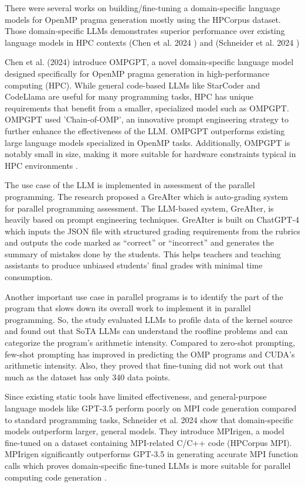 \documentclass[conference]{IEEEtran}
\begin{document}
There were several works on building/fine-tuning a domain-specific language models for OpenMP pragma generation mostly using the HPCorpus dataset. Those domain-specific LLMs demonstrates superior performance over existing language models in HPC contexts (Chen et al. 2024 \cite{Chen2024OMPGPTAG}) and (Schneider et al. 2024 \cite{Schneider2024MPIrigenMC})

Chen et al. (2024) introduce OMPGPT, a novel domain-specific language model designed specifically for OpenMP pragma generation in high-performance computing (HPC). While general code-based LLMs like StarCoder and CodeLlama are useful for many programming tasks, HPC has unique requirements that benefit from a smaller, specialized model such as OMPGPT. OMPGPT used 'Chain-of-OMP', an innovative prompt engineering strategy to further enhance the effectiveness of the LLM. OMPGPT outperforms existing large language models specialized in OpenMP tasks. Additionally, OMPGPT is notably small in size, making it more suitable for hardware constraints typical in HPC environments \cite{Chen2024OMPGPTAG}.

The use case of the LLM is implemented in assessment of the parallel programming. The research \cite{grandel2024applying} proposed a GreAIter which is auto-grading system for parallel programming assessment. The LLM-based system, GreAIter, is heavily based on prompt engineering techniques. GreAIter is built on ChatGPT-4 which inputs the JSON file with structured grading requirements from the rubrics and outputs the code marked as “correct” or “incorrect” and generates the summary of mistakes done by the students. This helps teachers and teaching assistants to produce unbiased students’ final grades with minimal time consumption. 

Another important use case in parallel programs is to identify the part of the program that slows down its overall work to implement it in parallel programming. So, the study \cite{ bolet2025can} evaluated LLMs to profile data of the kernel source and found out that SoTA LLMs can understand the roofline problems and can categorize the program’s arithmetic intensity. Compared to zero-shot prompting, few-shot prompting has improved in predicting the OMP programs and CUDA’s arithmetic intensity. Also, they proved that fine-tuning did not work out that much as the dataset has only 340 data points. 


Since existing static tools have limited effectiveness, and general-purpose language models like GPT-3.5 perform poorly on MPI code generation compared to standard programming tasks, Schneider et al. 2024 show that domain-specific models outperform larger, general models. They introduce MPIrigen, a model fine-tuned on a dataset containing MPI-related C/C++ code (HPCorpus MPI). MPIrigen significantly outperforms GPT-3.5 in generating accurate MPI function calls which proves domain-specific fine-tuned LLMs is more suitable for parallel computing code generation \cite{Schneider2024MPIrigenMC}.
\end{document}
